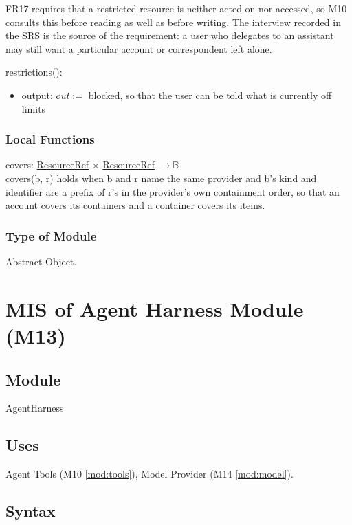 \documentclass[12pt, titlepage]{article}
\newcommand{\B}{\mathbb{B}}
\begin{document}
\noindent FR17 requires that a restricted resource is neither acted on nor
accessed, so M10 consults this before reading as well as before writing. The
interview recorded in the SRS is the source of the requirement: a user who
delegates to an assistant may still want a particular account or correspondent
left alone.

\noindent restrictions():
\begin{itemize}
\item output: $out :=$ blocked, so that the user can be told what is currently
off limits
\end{itemize}

\subsubsection{Local Functions}

\noindent covers: \hyperref[type:ResourceRef]{ResourceRef} $\times$
\hyperref[type:ResourceRef]{ResourceRef} $\to \B$\\
covers(b, r) holds when b and r name the same provider and b's kind and
identifier are a prefix of r's in the provider's own containment order, so that
an account covers its containers and a container covers its items.

\subsubsection{Type of Module}

Abstract Object.

\newpage

\section{MIS of Agent Harness Module (M13)} \label{mod:harness}

\subsection{Module}

AgentHarness

\subsection{Uses}

Agent Tools (M10 \ref{mod:tools}), Model Provider (M14 \ref{mod:model}).

\subsection{Syntax}
\end{document}
